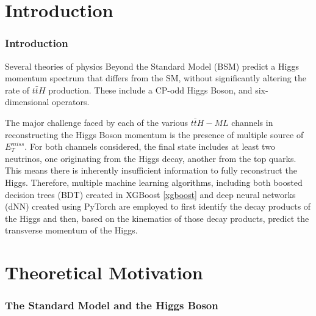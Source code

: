 \documentclass[NOTE, atlasdraft=true, texlive=2016, UKenglish]{\ATLASLATEXPATH atlasdoc}
\begin{document}
\maketitle

\tableofcontents

\clearpage

\part{Introduction}

\section{Introduction}
\label{sec:intro}

Several theories of physics Beyond the Standard Model (BSM) predict a Higgs momentum spectrum that differs from the SM, without significantly altering the rate of $t\bar{t}H$ production. These include a CP-odd Higgs Boson, and six-dimensional operators. 

The major challenge faced by each of the various $t\bar{t}H-ML$ channels in reconstructing the Higgs Boson momentum is the presence of multiple source of $E_T^{miss}$. For both channels considered, the final state includes at least two neutrinos, one originating from the Higgs decay, another from the top quarks. This means there is inherently insufficient information to fully reconstruct the Higgs. Therefore, multiple machine learning algorithms, including both boosted decision trees (BDT) created in XGBoost \ref{xgboost} and deep neural networks (dNN) created using PyTorch are employed to first identify the decay products of the Higgs and then, based on the kinematics of those decay products, predict the transverse momentum of the Higgs.

\part{Theoretical Motivation}
\label{sec:theory}

\section{The Standard Model and the Higgs Boson}
\label{sec:sm}
\end{document}
